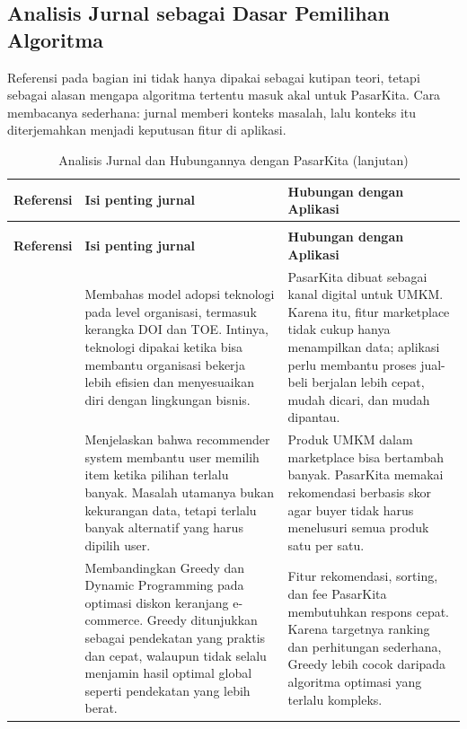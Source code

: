\subsection{Analisis Jurnal sebagai Dasar Pemilihan Algoritma}

Referensi pada bagian ini tidak hanya dipakai sebagai kutipan teori, tetapi sebagai alasan mengapa algoritma tertentu masuk akal untuk PasarKita. Cara membacanya sederhana: jurnal memberi konteks masalah, lalu konteks itu diterjemahkan menjadi keputusan fitur di aplikasi.

\begingroup
\scriptsize
\renewcommand{\arraystretch}{1.15}
\begin{longtable}{@{} >{\raggedright\arraybackslash}p{} >{\raggedright\arraybackslash}p{} >{\raggedright\arraybackslash}p{} @{}}
    \caption{Analisis Jurnal dan Hubungannya dengan PasarKita}
    \label{tab:analisis-jurnal}\\
    \toprule
    \textbf{Referensi} & \textbf{Isi penting jurnal} & \textbf{Hubungan dengan Aplikasi} \\
    \midrule
    \endfirsthead
    \caption[]{Analisis Jurnal dan Hubungannya dengan PasarKita (lanjutan)}\\
    \toprule
    \textbf{Referensi} & \textbf{Isi penting jurnal} & \textbf{Hubungan dengan Aplikasi} \\
    \midrule
    \endhead
    \bottomrule
    \endfoot
    \textcite{Oliveira2011} & Membahas model adopsi teknologi pada level organisasi, termasuk kerangka DOI dan TOE. Intinya, teknologi dipakai ketika bisa membantu organisasi bekerja lebih efisien dan menyesuaikan diri dengan lingkungan bisnis. & PasarKita dibuat sebagai kanal digital untuk UMKM. Karena itu, fitur marketplace tidak cukup hanya menampilkan data; aplikasi perlu membantu proses jual-beli berjalan lebih cepat, mudah dicari, dan mudah dipantau. \\
    \addlinespace
    \textcite{Resnick1997} & Menjelaskan bahwa recommender system membantu user memilih item ketika pilihan terlalu banyak. Masalah utamanya bukan kekurangan data, tetapi terlalu banyak alternatif yang harus dipilih user. & Produk UMKM dalam marketplace bisa bertambah banyak. PasarKita memakai rekomendasi berbasis skor agar buyer tidak harus menelusuri semua produk satu per satu. \\
    \addlinespace
    \textcite{Tanujaya2026} & Membandingkan Greedy dan Dynamic Programming pada optimasi diskon keranjang e-commerce. Greedy ditunjukkan sebagai pendekatan yang praktis dan cepat, walaupun tidak selalu menjamin hasil optimal global seperti pendekatan yang lebih berat. & Fitur rekomendasi, sorting, dan fee PasarKita membutuhkan respons cepat. Karena targetnya ranking dan perhitungan sederhana, Greedy lebih cocok daripada algoritma optimasi yang terlalu kompleks. \\

\end{longtable}
